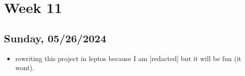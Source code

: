\newpage
\section{Week 11}
\subsection*{Sunday, 05/26/2024}
\begin{itemize}
    \item rewriting this project in leptos because I am [redacted] but it will
        be fun (it wont).
\end{itemize}
